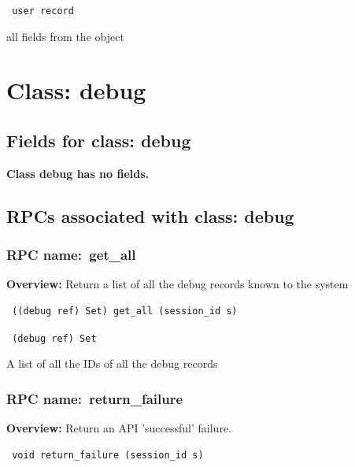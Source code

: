 \vspace{0.3cm}

{\tt 
user record
}


all fields from the object
\vspace{0.3cm}
\vspace{0.3cm}
\vspace{0.3cm}

\vspace{1cm}
\newpage
\section{Class: debug}
\subsection{Fields for class: debug}
{\bf Class debug has no fields.}
\subsection{RPCs associated with class: debug}
\subsubsection{RPC name:~get\_all}

{\bf Overview:} 
Return a list of all the debug records known to the system

\begin{verbatim} ((debug ref) Set) get_all (session_id s)\end{verbatim}


\vspace{0.3cm}

{\tt 
(debug ref) Set
}


A list of all the IDs of all the debug records
\vspace{0.3cm}
\vspace{0.3cm}
\vspace{0.3cm}
\subsubsection{RPC name:~return\_failure}

{\bf Overview:} 
Return an API 'successful' failure.

\begin{verbatim} void return_failure (session_id s)\end{verbatim}


